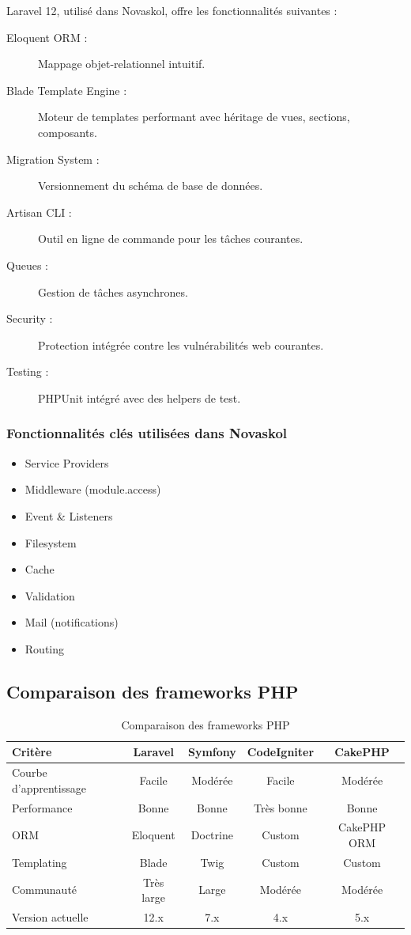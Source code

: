 \documentclass[12pt,a4paper,twoside]{report}
\begin{document}
Laravel 12, utilisé dans Novaskol, offre les fonctionnalités suivantes :

\begin{description}
    \item[Eloquent ORM :] Mappage objet-relationnel intuitif.
    \item[Blade Template Engine :] Moteur de templates performant avec héritage de vues, sections, composants.
    \item[Migration System :] Versionnement du schéma de base de données.
    \item[Artisan CLI :] Outil en ligne de commande pour les tâches courantes.
    \item[Queues :] Gestion de tâches asynchrones.
    \item[Security :] Protection intégrée contre les vulnérabilités web courantes.
    \item[Testing :] PHPUnit intégré avec des helpers de test.
\end{description}

\subsubsection{Fonctionnalités clés utilisées dans Novaskol}

\begin{itemize}
    \item Service Providers
    \item Middleware (module.access)
    \item Event \& Listeners
    \item Filesystem
    \item Cache
    \item Validation
    \item Mail (notifications)
    \item Routing
\end{itemize}

\subsection{Comparaison des frameworks PHP}

\begin{table}[h]
\centering
\caption{Comparaison des frameworks PHP}
\begin{tabular}{lcccc}
\toprule
Critère & Laravel & Symfony & CodeIgniter & CakePHP \\
\midrule
Courbe d'apprentissage & Facile & Modérée & Facile & Modérée \\
Performance & Bonne & Bonne & Très bonne & Bonne \\
ORM & Eloquent & Doctrine & Custom & CakePHP ORM \\
Templating & Blade & Twig & Custom & Custom \\
Communauté & Très large & Large & Modérée & Modérée \\
Version actuelle & 12.x & 7.x & 4.x & 5.x \\
\bottomrule
\end{tabular}
\end{table}
\end{document}
